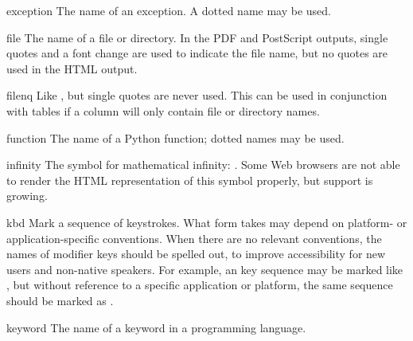 \documentclass{howto}
\begin{document}
    \begin{macrodesc}{exception}{}
      The name of an exception.  A dotted name may be used.
    \end{macrodesc}

    \begin{macrodesc}{file}{}
      The name of a file or directory.  In the PDF and PostScript
      outputs, single quotes and a font change are used to indicate
      the file name, but no quotes are used in the HTML output.
    \end{macrodesc}

    \begin{macrodesc}{filenq}{}
      Like , but single quotes are never used.  This can
      be used in conjunction with tables if a column will only contain
      file or directory names.
    \end{macrodesc}

    \begin{macrodesc}{function}{}
      The name of a Python function; dotted names may be used.
    \end{macrodesc}

    \begin{macrodesc}{infinity}{}
      The symbol for mathematical infinity: \infinity.  Some Web
      browsers are not able to render the HTML representation of this
      symbol properly, but support is growing.
    \end{macrodesc}

    \begin{macrodesc}{kbd}{}
      Mark a sequence of keystrokes.  What form 
      takes may depend on platform- or application-specific
      conventions.  When there are no relevant conventions, the names
      of modifier keys should be spelled out, to improve accessibility
      for new users and non-native speakers.  For example, an
       key sequence may be marked like
      , but without reference to a specific
      application or platform, the same sequence should be marked as
      .
    \end{macrodesc}

    \begin{macrodesc}{keyword}{}
      The name of a keyword in a programming language.
    \end{macrodesc}
\end{document}
